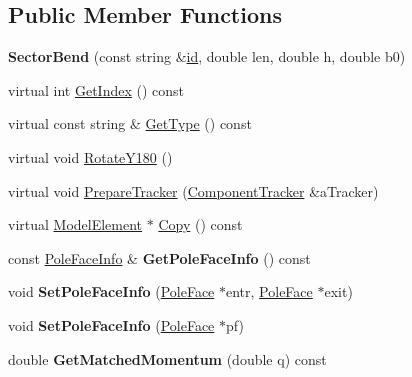 \subsection*{Public Member Functions}
\begin{DoxyCompactItemize}
\item 
\mbox{\label{classSectorBend_aac96074d23766c7da2e5513e4f35678a}} 
{\bfseries Sector\+Bend} (const string \&\hyperlink{classModelElement_aada171ead2085c75b592cf07d91bc5c2}{id}, double len, double h, double b0)
\item 
virtual int \hyperlink{classSectorBend_a1af1ee7a97aa40bc6def14dec661eb3e}{Get\+Index} () const
\item 
virtual const string \& \hyperlink{classSectorBend_a4721383872aa001dc557acb546f25929}{Get\+Type} () const
\item 
virtual void \hyperlink{classSectorBend_abd8059191bd4c947320b7fe5f6736e95}{Rotate\+Y180} ()
\item 
virtual void \hyperlink{classSectorBend_a1278a47ce282b1229909304ac853fd22}{Prepare\+Tracker} (\hyperlink{classComponentTracker}{Component\+Tracker} \&a\+Tracker)
\item 
virtual \hyperlink{classModelElement}{Model\+Element} $\ast$ \hyperlink{classSectorBend_a0f6e6636cd2db549f55f3d630223f9c6}{Copy} () const
\item 
\mbox{\label{classSectorBend_a63b7944019b508d84afe23ec36a67e57}} 
const \hyperlink{classSectorBend_1_1PoleFaceInfo}{Pole\+Face\+Info} \& {\bfseries Get\+Pole\+Face\+Info} () const
\item 
\mbox{\label{classSectorBend_a4d72e877d274db950502c281d3862840}} 
void {\bfseries Set\+Pole\+Face\+Info} (\hyperlink{classSectorBend_1_1PoleFace}{Pole\+Face} $\ast$entr, \hyperlink{classSectorBend_1_1PoleFace}{Pole\+Face} $\ast$exit)
\item 
\mbox{\label{classSectorBend_ada6c5dcc874e0476133cab75605bae82}} 
void {\bfseries Set\+Pole\+Face\+Info} (\hyperlink{classSectorBend_1_1PoleFace}{Pole\+Face} $\ast$pf)
\item 
\mbox{\label{classSectorBend_a9b7a77655949e4dee41ae4bfcd55d77a}} 
double {\bfseries Get\+Matched\+Momentum} (double q) const
\item 

\end{DoxyCompactItemize}
